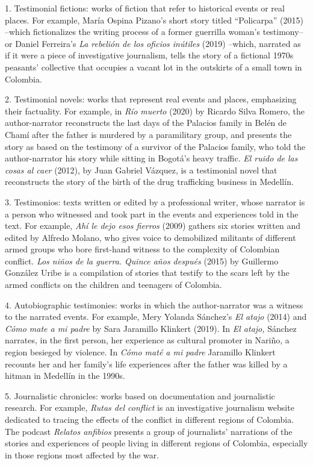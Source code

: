 \documentclass[
  11pt,
,
onecolumn,
openany
]{book}
\begin{document}
1. Testimonial fictions: works of fiction that refer to historical events or
real places. For example, María Ospina Pizano's short story titled
``Policarpa'' (2015) --which fictionalizes the writing process of a former
guerrilla woman's testimony-- or Daniel Ferreira's \emph{La rebelión de los
oficios inútiles} (2019) --which, narrated as if it were a piece of
investigative journalism, tells the story of a fictional 1970s peasants'
collective that occupies a vacant lot in the outskirts of a small town in
Colombia.

2. Testimonial novels: works that represent real events and places,
emphasizing their factuality. For example, in \emph{Río muerto} (2020) by
Ricardo Silva Romero, the author-narrator reconstructs the last days of the
Palacios family in Belén de Chamí after the father is murdered by a
paramilitary group, and presents the story as based on the testimony of a
survivor of the Palacios family, who told the author-narrator his story while
sitting in Bogotá's heavy traffic. \emph{El ruido de las cosas al caer}
(2012), by Juan Gabriel Vázquez, is a testimonial novel that reconstructs the
story of the birth of the drug trafficking business in Medellín.

3. Testimonios: texts written or edited by a professional writer, whose
narrator is a person who witnessed and took part in the events and experiences
told in the text. For example, \emph{Ahí le dejo esos fierros} (2009) gathers
six stories written and edited by Alfredo Molano, who gives voice to
demobilized militants of different armed groups who bore first-hand witness to
the complexity of Colombian conflict. \emph{Los niños de la guerra. Quince
años después} (2015) by Guillermo González Uribe is a compilation of stories
that testify to the scars left by the armed conflicts on the children and
teenagers of Colombia.

4. Autobiographic testimonies: works in which the author-narrator was a
witness to the narrated events. For example, Mery Yolanda Sánchez's \emph{El
atajo} (2014) and \emph{Cómo mate a mi padre} by Sara Jaramillo Klinkert
(2019). In \emph{El atajo,} Sánchez narrates, in the first person, her
experience as cultural promoter in Nariño, a region besieged by violence. In
\emph{Cómo maté a mi padre} Jaramillo Klinkert recounts her and her family's
life experiences after the father was killed by a hitman in Medellín in the
1990s.

5. Journalistic chronicles: works based on documentation and journalistic
research. For example, \emph{Rutas del conflict} is an investigative
journalism website dedicated to tracing the effects of the conflict in
different regions of Colombia. The podcast \emph{Relatos anfibios} presents a
group of journalists' narrations of the stories and experiences of people
living in different regions of Colombia, especially in those regions most
affected by the war.
\end{document}
